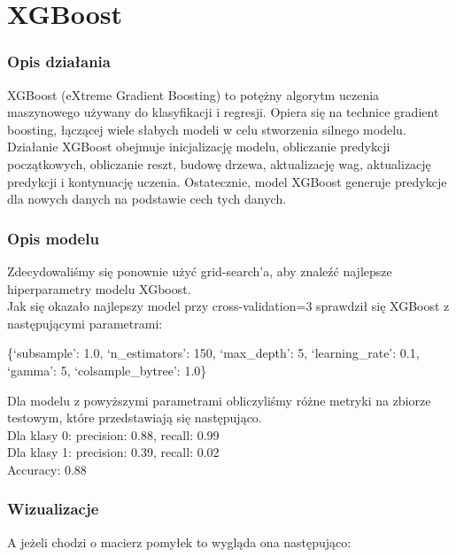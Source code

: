 \documentclass[11pt]{article}
\begin{document}
    \hypertarget{xgboost}{%
\section{XGBoost}\label{xgboost}}

\hypertarget{opis-dziaux142ania}{%
\subsubsection{Opis działania}\label{opis-dziaux142ania}}

XGBoost (eXtreme Gradient Boosting) to potężny algorytm uczenia
maszynowego używany do klasyfikacji i regresji. Opiera się na technice
gradient boosting, łączącej wiele słabych modeli w celu stworzenia
silnego modelu. Działanie XGBoost obejmuje inicjalizację modelu,
obliczanie predykcji początkowych, obliczanie reszt, budowę drzewa,
aktualizację wag, aktualizację predykcji i kontynuację uczenia.
Ostatecznie, model XGBoost generuje predykcje dla nowych danych na
podstawie cech tych danych.

\hypertarget{opis-modelu}{%
\subsubsection{Opis modelu}\label{opis-modelu}}

Zdecydowaliśmy się ponownie użyć grid-search'a, aby znaleźć najlepsze
hiperparametry modelu XGboost.\\
Jak się okazało najlepszy model przy cross-validation=3 sprawdził się
XGBoost z następującymi parametrami:

\{`subsample': 1.0, `n\_estimators': 150, `max\_depth': 5,
`learning\_rate': 0.1, `gamma': 5, `colsample\_bytree': 1.0\}

Dla modelu z powyższymi parametrami obliczyliśmy różne metryki na
zbiorze testowym, które przedstawiają się następująco.\\
Dla klasy 0: precision: 0.88, recall: 0.99\\
Dla klasy 1: precision: 0.39, recall: 0.02\\
Accuracy: 0.88\\

\hypertarget{wizualizacje}{%
\subsubsection{Wizualizacje}\label{wizualizacje}}

A jeżeli chodzi o macierz pomyłek to wygląda ona następująco:
\end{document}
